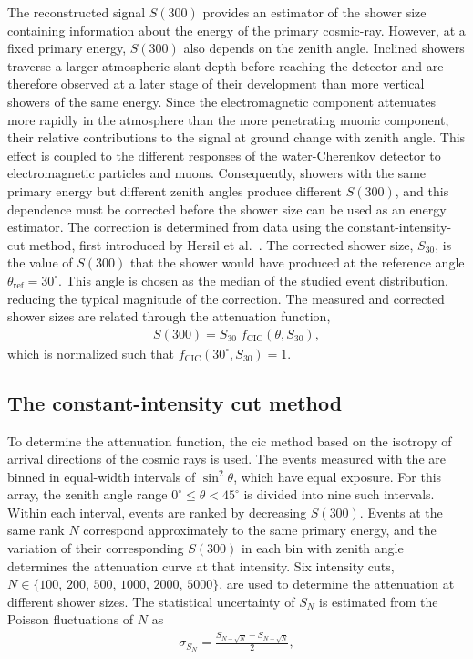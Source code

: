 \documentclass[main.tex]{subfiles}
\begin{document}
The reconstructed signal $S(300)$ provides an estimator of the shower size containing information about the energy of the primary cosmic-ray.
However, at a fixed primary energy, $S(300)$ also depends on the zenith angle.
Inclined showers traverse a larger atmospheric slant depth before reaching the detector and are therefore observed at a later stage of their development than more vertical showers of the same energy.
Since the electromagnetic component attenuates more rapidly in the atmosphere than the more penetrating muonic component, their relative contributions to the signal at ground change with zenith angle.
This effect is coupled to the different responses of the water-Cherenkov detector to electromagnetic particles and muons.
Consequently, showers with the same primary energy but different zenith angles produce different $S(300)$, and this dependence must be corrected before the shower size can be used as an energy estimator.
The correction is determined from data using the constant-intensity-cut method, first introduced by Hersil et al.~\cite{Hirsil:1961:CIC}.
The corrected shower size, $S_{30}$, is the value of $S(300)$ that the shower would have produced at the reference angle $\theta_{\text{ref}}=30^\circ$.
This angle is chosen as the median of the studied event distribution, reducing the typical magnitude of the correction.
The measured and corrected shower sizes are related through the attenuation function,
\begin{align}
    S(300)=S_{30} \; f_{\text{CIC}}(\theta,S_{30}),
    \label{eq:attenuation}
\end{align}
which is normalized such that $f_{\text{CIC}}(30^\circ,S_{30})=1$.

\subsection{The constant-intensity cut method}
\label{subsec:cic_method}
To determine the attenuation function, the \gls{cic} method based on the isotropy of arrival directions of the cosmic rays is used.
The events measured with the  are binned in equal-width intervals of $\sin^2\theta$, which have equal exposure.
For this array, the zenith angle range $0^\circ\leq\theta<45^\circ$ is divided into nine such intervals.
Within each interval, events are ranked by decreasing $S(300)$.
Events at the same rank $N$ correspond approximately to the same primary energy, and the variation of their corresponding $S(300)$ in each bin with zenith angle determines the attenuation curve at that intensity.
Six intensity cuts, $N\in\{100,\,200,\,500,\,1000,\,2000,\,5000\}$, are used to determine the attenuation at different shower sizes.
The statistical uncertainty of $S_N$ is estimated from the Poisson fluctuations of $N$ as
\begin{align}
    \sigma_{S_N}
    =
    \frac{S_{N-\sqrt{N}}-S_{N+\sqrt{N}}}{2},
\end{align}
\end{document}
